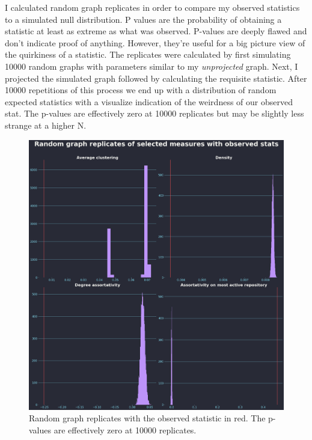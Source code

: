 \documentclass[12pt, a4paper]{article}
\begin{document}
I calculated random graph replicates in order to compare my observed statistics to a simulated null distribution. P values are the probability of obtaining a statistic at least as extreme as what was observed. P-values are deeply flawed and don't indicate proof of anything. However, they're useful for a big picture view of the quirkiness of a statistic. The replicates were calculated by first simulating 10000 random graphs with parameters similar to my \textit{unprojected} graph. Next, I projected the simulated graph followed by calculating the requisite statistic. After 10000 repetitions of this process we end up with a distribution of random expected statistics with a visualize indication of the weirdness of our observed stat. The p-values are effectively zero at 10000 replicates but may be slightly less strange at a higher N.

\begin{figure}
    \includegraphics[width=\linewidth]{metrics_dist_w_obs.png}
    \caption{Random graph replicates with the observed statistic in red. The p-values are effectively zero at 10000 replicates.}
    \label{fig:metricswobs}
\end{figure}
\end{document}
